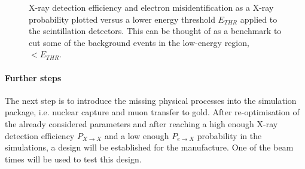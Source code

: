 \documentclass[12pt]{article}
\begin{document}
\begin{figure}[!htbp]
\begin{subfigure}{.485\textwidth}
	\label{fig:planar}
\end{subfigure}	
\caption{X-ray detection efficiency and electron misidentification as a X-ray probability plotted versus a lower energy threshold $E_{THR}$ applied to the scintillation detectors. This can be thought of as a benchmark to cut some of the background events in the low-energy region, $< E_{THR}$.}
\label{fig:misid}
\end{figure}

\paragraph{Further steps}
The next step is to introduce the missing physical processes into the simulation package, i.e. nuclear capture and muon transfer to gold. After re-optimisation of the already considered parameters and after reaching a high enough X-ray detection efficiency $P_{X{\rightarrow}X}$ and a low enough $P_{e{\rightarrow}X}$ probability in the simulations, a design will be established for the manufacture. One of the beam times will be used to test this design.



\end{document}
